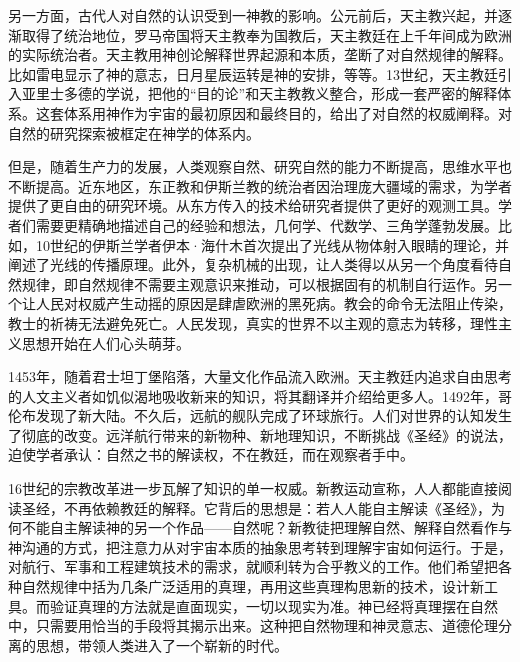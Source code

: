 \documentclass[12pt,UTF8,fontset=none]{ctexbook}
\begin{document}
另一方面，古代人对自然的认识受到一神教的影响。公元前后，天主教兴起，并逐渐取得了统治地位，罗马帝国将天主教奉为国教后，天主教廷在上千年间成为欧洲的实际统治者。天主教用神创论解释世界起源和本质，垄断了对自然规律的解释。比如雷电显示了神的意志，日月星辰运转是神的安排，等等。13世纪，天主教廷引入亚里士多德的学说，把他的“目的论”和天主教教义整合，形成一套严密的解释体系。这套体系用神作为宇宙的最初原因和最终目的，给出了对自然的权威阐释。对自然的研究探索被框定在神学的体系内。

但是，随着生产力的发展，人类观察自然、研究自然的能力不断提高，思维水平也不断提高。近东地区，东正教和伊斯兰教的统治者因治理庞大疆域的需求，为学者提供了更自由的研究环境。从东方传入的技术给研究者提供了更好的观测工具。学者们需要更精确地描述自己的经验和想法，几何学、代数学、三角学蓬勃发展。比如，10世纪的伊斯兰学者伊本·海什木首次提出了光线从物体射入眼睛的理论，并阐述了光线的传播原理。此外，复杂机械的出现，让人类得以从另一个角度看待自然规律，即自然规律不需要主观意识来推动，可以根据固有的机制自行运作。另一个让人民对权威产生动摇的原因是肆虐欧洲的黑死病。教会的命令无法阻止传染，教士的祈祷无法避免死亡。人民发现，真实的世界不以主观的意志为转移，理性主义思想开始在人们心头萌芽。

1453年，随着君士坦丁堡陷落，大量文化作品流入欧洲。天主教廷内追求自由思考的人文主义者如饥似渴地吸收新来的知识，将其翻译并介绍给更多人。1492年，哥伦布发现了新大陆。不久后，远航的舰队完成了环球旅行。人们对世界的认知发生了彻底的改变。远洋航行带来的新物种、新地理知识，不断挑战《圣经》的说法，迫使学者承认：自然之书的解读权，不在教廷，而在观察者手中。

16世纪的宗教改革进一步瓦解了知识的单一权威。新教运动宣称，人人都能直接阅读圣经，不再依赖教廷的解释。它背后的思想是：若人人能自主解读《圣经》，为何不能自主解读神的另一个作品——自然呢？新教徒把理解自然、解释自然看作与神沟通的方式，把注意力从对宇宙本质的抽象思考转到理解宇宙如何运行。于是，对航行、军事和工程建筑技术的需求，就顺利转为合乎教义的工作。他们希望把各种自然规律中括为几条广泛适用的真理，再用这些真理构思新的技术，设计新工具。而验证真理的方法就是直面现实，一切以现实为准。神已经将真理摆在自然中，只需要用恰当的手段将其揭示出来。这种把自然物理和神灵意志、道德伦理分离的思想，带领人类进入了一个崭新的时代。
\end{document}
